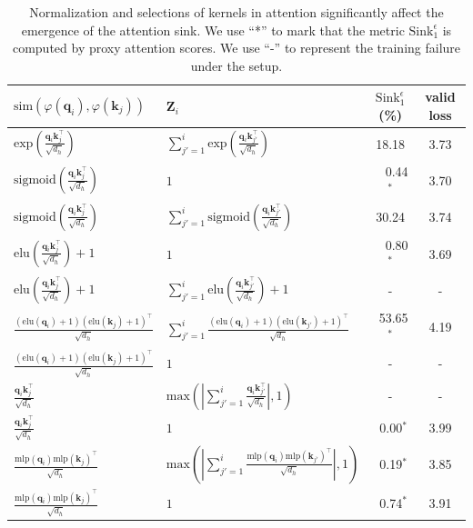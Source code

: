 \begin{table}[htbp]
\caption{Normalization and selections of kernels in attention significantly affect the emergence of the attention sink. We use ``*'' to mark that the metric $\textrm{Sink}_1^{\epsilon}$ is computed by proxy attention scores. We use ``-'' to represent the training failure under the setup.}
\vspace{-.2cm}
\begin{center}
\begin{tabular}{l|l|cc}
\toprule
  $\textrm{sim}(\varphi(\boldsymbol{q}_i)\textrm{,}\,\varphi(\boldsymbol{k}_j))$ & $\boldsymbol{Z}_i$ & $\textrm{Sink}_1^{\epsilon}$(\%) & valid loss \\
\midrule
 $\textrm{exp}(\frac{\boldsymbol{q}_i\boldsymbol{k}_j^\top}{\sqrt{d_h}})$ & $\sum_{j'=1}^i \textrm{exp}(\frac{\boldsymbol{q}_i\boldsymbol{k}_{j'}^\top}{\sqrt{d_h}})$ & 18.18 & 3.73 \\
 $\textrm{sigmoid}(\frac{\boldsymbol{q}_i\boldsymbol{k}_j^\top}{\sqrt{d_h}})$ & $1$ & \,\,\,\,\,\,0.44$^*$ &  3.70 \\
$\textrm{sigmoid}(\frac{\boldsymbol{q}_i\boldsymbol{k}_j^\top}{\sqrt{d_h}})$ & $\sum_{j'=1}^i \textrm{sigmoid}(\frac{\boldsymbol{q}_i\boldsymbol{k}_{j'}^\top}{\sqrt{d_h}})$ & 30.24 & 3.74 \\
 $\textrm{elu}(\frac{\boldsymbol{q}_i\boldsymbol{k}_j^\top}{\sqrt{d_h}})+1$ & $1$ & \,\,\,\,\,\,0.80$^*$ &  3.69 \\ 
 $\textrm{elu}(\frac{\boldsymbol{q}_i\boldsymbol{k}_{j}^\top}{\sqrt{d_h}})+1$ & $\sum_{j'=1}^i \textrm{elu}(\frac{\boldsymbol{q}_i\boldsymbol{k}_{j'}^\top}{\sqrt{d_h}})+1$ & - & - \\ 
 \midrule
$\frac{(\textrm{elu}(\boldsymbol{q}_i)+1)(\textrm{elu}(\boldsymbol{k}_j)+1)^\top}{\sqrt{d_h}}$ & $\sum_{j'=1}^i\frac{(\textrm{elu}(\boldsymbol{q}_i)+1)(\textrm{elu}(\boldsymbol{k}_{j'})+1)^\top}{\sqrt{d_h}}$ & \,\,\,53.65$^*$ & 4.19\\ 
$\frac{(\textrm{elu}(\boldsymbol{q}_i)+1)(\textrm{elu}(\boldsymbol{k}_j)+1)^\top}{\sqrt{d_h}}$ & $1$ & -  & - \\ 
$\frac{\boldsymbol{q}_i\boldsymbol{k}_{j}^\top}{\sqrt{d_h}}$ &  $\textrm{max}\left(\left|\sum_{j'=1}^i\frac{\boldsymbol{q}_i\boldsymbol{k}_{j'}^\top}{\sqrt{d_h}}\right|\textrm{,}\,1\right)$ & - &  -\\
$\frac{\boldsymbol{q}_i\boldsymbol{k}_{j}^\top}{\sqrt{d_h}}$ & $1$ & \,\,\,0.00$^*$ & 3.99 \\
$\frac{\textrm{mlp}(\boldsymbol{q}_i)\textrm{mlp}(\boldsymbol{k}_j)^\top}{\sqrt{d_h}}$ &  $\textrm{max}\left(\left|\sum_{j'=1}^i\frac{\textrm{mlp}(\boldsymbol{q}_i)\textrm{mlp}(\boldsymbol{k}_{j'})^\top}{\sqrt{d_h}}\right|\textrm{,}\,1\right)$ & \,\,\,0.19$^*$ &  3.85\\
$\frac{\textrm{mlp}(\boldsymbol{q}_i)\textrm{mlp}(\boldsymbol{k}_j)^\top}{\sqrt{d_h}}$ & $1$ & \,\,\,0.74$^*$ & 3.91 \\
\bottomrule
\end{tabular}
\end{center}
\vspace{-.2cm}
\label{appendix_operation}
\end{table}